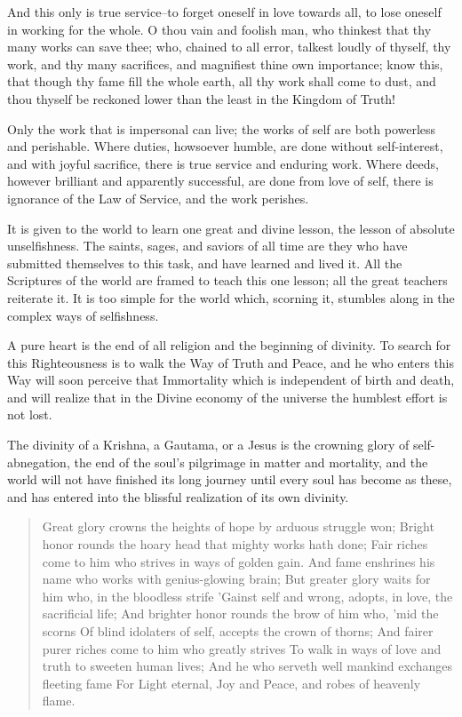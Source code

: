 \documentclass[12pt,oneside]{scrbook}
\begin{document}
  And this only is true service--to forget oneself in love towards all, to
  lose oneself in working for the whole. O thou vain and foolish man, who
  thinkest that thy many works can save thee; who, chained to all error,
  talkest loudly of thyself, thy work, and thy many sacrifices, and
  magnifiest thine own importance; know this, that though thy fame fill
  the whole earth, all thy work shall come to dust, and thou thyself be
  reckoned lower than the least in the Kingdom of Truth!
  
  Only the work that is impersonal can live; the works of self are both
  powerless and perishable. Where duties, howsoever humble, are done
  without self-interest, and with joyful sacrifice, there is true service
  and enduring work. Where deeds, however brilliant and apparently
  successful, are done from love of self, there is ignorance of the Law of
  Service, and the work perishes.
  
  It is given to the world to learn one great and divine lesson, the
  lesson of absolute unselfishness. The saints, sages, and saviors of all
  time are they who have submitted themselves to this task, and have
  learned and lived it. All the Scriptures of the world are framed to
  teach this one lesson; all the great teachers reiterate it. It is too
  simple for the world which, scorning it, stumbles along in the complex
  ways of selfishness.
  
  A pure heart is the end of all religion and the beginning of divinity.
  To search for this Righteousness is to walk the Way of Truth and Peace,
  and he who enters this Way will soon perceive that Immortality which is
  independent of birth and death, and will realize that in the Divine
  economy of the universe the humblest effort is not lost.
  
  The divinity of a Krishna, a Gautama, or a Jesus is the crowning glory
  of self-abnegation, the end of the soul's pilgrimage in matter and
  mortality, and the world will not have finished its long journey until
  every soul has become as these, and has entered into the blissful
  realization of its own divinity.
  
  \begin{quote}
  Great glory crowns the heights of hope by arduous struggle won; Bright
  honor rounds the hoary head that mighty works hath done; Fair riches
  come to him who strives in ways of golden gain. And fame enshrines his
  name who works with genius-glowing brain; But greater glory waits for
  him who, in the bloodless strife 'Gainst self and wrong, adopts, in
  love, the sacrificial life; And brighter honor rounds the brow of him
  who, 'mid the scorns Of blind idolaters of self, accepts the crown of
  thorns; And fairer purer riches come to him who greatly strives To walk
  in ways of love and truth to sweeten human lives; And he who serveth
  well mankind exchanges fleeting fame For Light eternal, Joy and Peace,
  and robes of heavenly flame.
  \end{quote}
  
\end{document}
